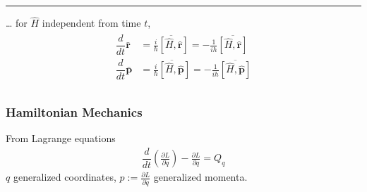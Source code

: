 \documentclass[letterpaper,10pt,english]{jupyterBook}
\begin{document}
\bigskip\hrule\bigskip


\sphinxAtStartPar
{} …
for \(\hat{H}\) independent from time \(t\),
\begin{equation*}
\begin{split}\begin{aligned}
  \dfrac{d}{dt} \bar{\mathbf{r}} & = \overline{\frac{i}{\hbar} \left[ \hat{H}, \hat{\mathbf{r}} \right]} = - \frac{1}{ih} \overline{[ \hat{H}, \hat{\mathbf{r}} ]} \\
  \dfrac{d}{dt} \bar{\mathbf{p}} & = \overline{\frac{i}{\hbar} \left[ \hat{H}, \hat{\mathbf{p}} \right]} = - \frac{1}{ih} \overline{[ \hat{H}, \hat{\mathbf{p}} ]} \\
\end{aligned}\end{split}
\end{equation*}\subsubsection*{Hamiltonian Mechanics}

\sphinxAtStartPar
From Lagrange equations
\begin{equation*}
\begin{split}\dfrac{d}{dt} \left( \frac{\partial L}{\partial \dot{q}} \right) - \frac{\partial L}{\partial q} = Q_q\end{split}
\end{equation*}
\sphinxAtStartPar
\(q\) generalized coordinates, \(p:= \frac{\partial L}{\partial \dot{q}}\) generalized momenta.
\end{document}
